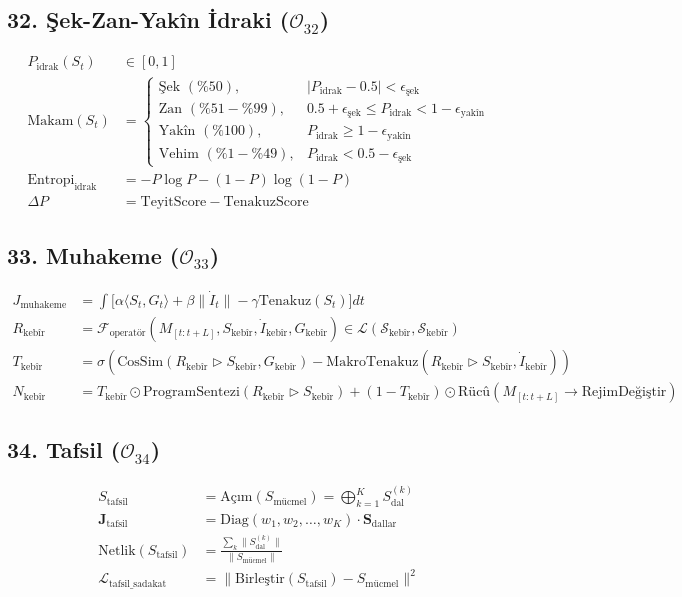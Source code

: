 \documentclass[11pt, a4paper]{article}
\begin{document}
\subsection{32. Şek-Zan-Yakîn İdraki ($\mathcal{O}_{32}$)}
\begin{align}
P_{\text{idrak}}(S_t) &\in [0, 1] \\
\text{Makam}(S_t) &= 
\begin{cases}
\text{Şek } (\%50), & |P_{\text{idrak}} - 0.5| < \epsilon_{\text{şek}} \\
\text{Zan } (\%51-\%99), & 0.5 + \epsilon_{\text{şek}} \le P_{\text{idrak}} < 1 - \epsilon_{\text{yakîn}} \\
\text{Yakîn } (\%100), & P_{\text{idrak}} \ge 1 - \epsilon_{\text{yakîn}} \\
\text{Vehim } (\%1-\%49), & P_{\text{idrak}} < 0.5 - \epsilon_{\text{şek}}
\end{cases} \\
\text{Entropi}_{\text{idrak}} &= -P \log P - (1-P) \log (1-P) \\
\Delta P &= \text{TeyitScore} - \text{TenakuzScore}
\end{align}

\subsection{33. Muhakeme ($\mathcal{O}_{33}$)}
\begin{align}
J_{\text{muhakeme}} &= \int \Big[ \alpha \langle S_t, G_t \rangle + \beta \|\dot{I}_t\| - \gamma \text{Tenakuz}(S_t) \Big] dt \\
R_{\text{kebîr}} &= \mathcal{F}_{\text{operatör}}(M_{[t:t+L]}, S_{\text{kebîr}}, \dot{I}_{\text{kebîr}}, G_{\text{kebîr}}) \in \mathcal{L}(\mathcal{S}_{\text{kebîr}}, \mathcal{S}_{\text{kebîr}}) \\
T_{\text{kebîr}} &= \sigma\left( \text{CosSim}(R_{\text{kebîr}} \triangleright S_{\text{kebîr}}, G_{\text{kebîr}}) - \text{MakroTenakuz}(R_{\text{kebîr}} \triangleright S_{\text{kebîr}}, \dot{I}_{\text{kebîr}}) \right) \\
N_{\text{kebîr}} &= T_{\text{kebîr}} \odot \text{ProgramSentezi}(R_{\text{kebîr}} \triangleright S_{\text{kebîr}}) + (1 - T_{\text{kebîr}}) \odot \text{Rücû}(M_{[t:t+L]} \to \text{RejimDeğiştir})
\end{align}

\subsection{34. Tafsil ($\mathcal{O}_{34}$)}
\begin{align}
S_{\text{tafsil}} &= \text{Açım}(S_{\text{mücmel}}) = \bigoplus_{k=1}^K S_{\text{dal}}^{(k)} \\
\mathbf{J}_{\text{tafsil}} &= \text{Diag}(w_1, w_2, \dots, w_K) \cdot \mathbf{S}_{\text{dallar}} \\
\text{Netlik}(S_{\text{tafsil}}) &= \frac{\sum_k \|S_{\text{dal}}^{(k)}\|}{\|S_{\text{mücmel}}\|} \\
\mathcal{L}_{\text{tafsil\_sadakat}} &= \| \text{Birleştir}(S_{\text{tafsil}}) - S_{\text{mücmel}} \|^2
\end{align}
\end{document}
